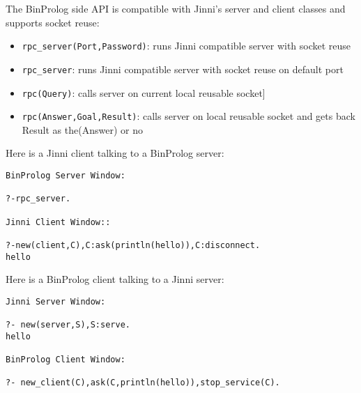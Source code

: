 \documentclass{article}
\begin{document}
The BinProlog side API is compatible with Jinni's server and client classes and supports socket reuse:

\begin{itemize}
\item {\tt rpc\_server(Port,Password)}: runs Jinni compatible server with socket reuse
\item {\tt rpc\_server}: runs Jinni compatible server with socket reuse on default port

\item {\tt rpc(Query)}: calls server on current local reusable socket]
\item {\tt rpc(Answer,Goal,Result)}: calls server on local reusable socket and
gets back Result as the(Answer) or no

\end{itemize}

Here is a Jinni client talking to a BinProlog server:

\begin{verbatim}
BinProlog Server Window:

?-rpc_server.

Jinni Client Window::

?-new(client,C),C:ask(println(hello)),C:disconnect.
hello
\end{verbatim}

Here is a BinProlog client talking to a Jinni server:

\begin{verbatim}
Jinni Server Window:

?- new(server,S),S:serve.
hello

BinProlog Client Window:

?- new_client(C),ask(C,println(hello)),stop_service(C).

\end{verbatim}



\end{document}
